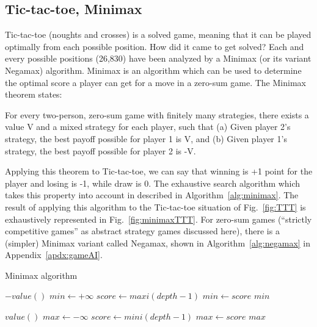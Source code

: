 \subsection{Tic-tac-toe, Minimax}
Tic-tac-toe (noughts and crosses) is a solved game, meaning that it can be played optimally from each possible position. How did it came to get solved? Each and every possible positions (26,830) have been analyzed by a Minimax (or its variant Negamax) algorithm. Minimax is an algorithm which can be used to determine the optimal score a player can get for a move in a zero-sum game. The Minimax theorem states:
\begin{mythm}
For every two-person, zero-sum game with finitely many strategies, there exists a value V and a mixed strategy for each player, such that (a) Given player 2's strategy, the best payoff possible for player 1 is V, and (b) Given player 1's strategy, the best payoff possible for player 2 is -V.
\end{mythm}
Applying this theorem to Tic-tac-toe, we can say that winning is +1 point for the player and losing is -1, while draw is 0. The exhaustive search algorithm which takes this property into account in described in Algorithm~\ref{alg:minimax}. The result of applying this algorithm to the Tic-tac-toe situation of Fig.~\ref{fig:TTT} is exhaustively represented in Fig.~\ref{fig:minimaxTTT}. For zero-sum games (``strictly competitive games'' as abstract strategy games discussed here), there is a (simpler) Minimax variant called Negamax, shown in Algorithm~\ref{alg:negamax} in Appendix~\ref{apdx:gameAI}.
\begin{algorithm}
\caption{Minimax algorithm}
\label{alg:minimax}
\begin{algorithmic}
        \State \Return $-value()$
    \EndIf
    \State $min \gets +\infty$
        \State $score \gets maxi(depth-1)$
            \State $min \gets score$
        \EndIf 
    \EndFor
    \State \Return $min$
\EndFunction

        \State \Return $value()$
    \EndIf
    \State $max \gets -\infty$
        \State $score \gets mini(depth-1)$
            \State $max \gets score$
        \EndIf
    \EndFor 
    \State \Return $max$
\EndFunction
\end{algorithmic}
\end{algorithm}

